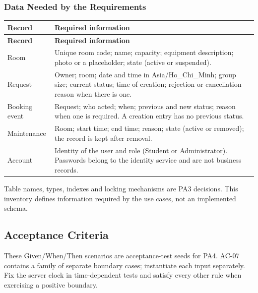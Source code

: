 \subsubsection{Data Needed by the Requirements}
\begingroup
\small
{}
\setlength{\tabcolsep}{3pt}
\renewcommand{\arraystretch}{1.12}
\begin{longtable}{|>{\raggedright\arraybackslash}p{}|>{\raggedright\arraybackslash}p{}|}
\hline
\textbf{Record} & \textbf{Required information} \\ \hline
\endfirsthead
\hline
\textbf{Record} & \textbf{Required information} \\ \hline
\endhead
\hline
\endfoot
\hline
\endlastfoot
Room & Unique room code; name; capacity; equipment description; photo or a placeholder; state (active or suspended). \\ \hline
Request & Owner; room; date and time in Asia/Ho\_Chi\_Minh; group size; current status; time of creation; rejection or cancellation reason when there is one. \\ \hline
Booking event & Request; who acted; when; previous and new status; reason when one is required. A creation entry has no previous status. \\ \hline
Maintenance & Room; start time; end time; reason; state (active or removed); the record is kept after removal. \\ \hline
Account & Identity of the user and role (Student or Administrator). Passwords belong to the identity service and are not business records. \\ \hline
\end{longtable}
\endgroup

Table names, types, indexes and locking mechanisms are PA3 decisions. This inventory defines information required by the use cases, not an implemented schema.

\subsection{Acceptance Criteria}
These Given/When/Then scenarios are acceptance-test seeds for PA4. AC-07 contains a family of separate boundary cases; instantiate each input separately. Fix the server clock in time-dependent tests and satisfy every other rule when exercising a positive boundary.

